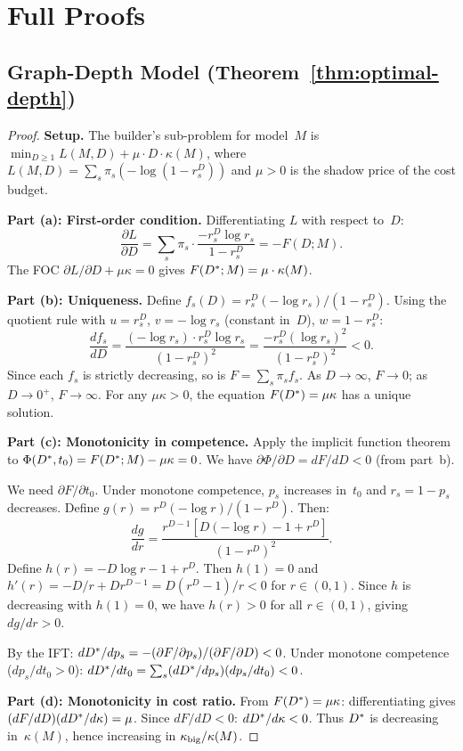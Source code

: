 \appendix
\section{Full Proofs}
\label{app:proofs}

\subsection{Graph-Depth Model (Theorem~\ref{thm:optimal-depth})}
\label{app:graph-depth}

\begin{proof}
\noindent\textbf{Setup.}
The builder's sub-problem for model~$M$ is
$\min_{D \ge 1} L(M,D) + \mu \cdot D \cdot \kappa(M)$,
where $L(M,D) = \sum_s \pi_s (-\log(1 - r_s^D))$ and $\mu > 0$ is the shadow price of the cost budget.

\noindent\textbf{Part (a): First-order condition.}
Differentiating $L$ with respect to~$D$:
\[
  \frac{\partial L}{\partial D}
  = \sum_s \pi_s \cdot \frac{-r_s^D \log r_s}{1 - r_s^D}
  = -F(D; M).
\]
The FOC $\partial L/\partial D + \mu \kappa = 0$ gives $F(D^*; M) = \mu \cdot \kappa(M)$.

\noindent\textbf{Part (b): Uniqueness.}
Define $f_s(D) = r_s^D (-\log r_s) / (1 - r_s^D)$.
Using the quotient rule with $u = r_s^D$, $v = -\log r_s$ (constant in~$D$), $w = 1 - r_s^D$:
\[
  \frac{df_s}{dD} = \frac{(-\log r_s) \cdot r_s^D \log r_s}{(1-r_s^D)^2}
  = \frac{-r_s^D (\log r_s)^2}{(1-r_s^D)^2} < 0.
\]
Since each $f_s$ is strictly decreasing, so is $F = \sum_s \pi_s f_s$.
As $D \to \infty$, $F \to 0$; as $D \to 0^+$, $F \to \infty$.
For any $\mu \kappa > 0$, the equation $F(D^*) = \mu \kappa$ has a unique solution.

\noindent\textbf{Part (c): Monotonicity in competence.}
Apply the implicit function theorem to $\Phi(D^*, t_0) = F(D^*; M) - \mu\kappa = 0$.
We have $\partial \Phi / \partial D = dF/dD < 0$ (from part~b).

We need $\partial F / \partial t_0$.
Under monotone competence, $p_s$ increases in~$t_0$ and $r_s = 1-p_s$ decreases.
Define $g(r) = r^D(-\log r)/(1-r^D)$.
Then:
\[
  \frac{dg}{dr} = \frac{r^{D-1}[D(-\log r) - 1 + r^D]}{(1-r^D)^2}.
\]
Define $h(r) = -D\log r - 1 + r^D$.
Then $h(1) = 0$ and $h'(r) = -D/r + Dr^{D-1} = D(r^D - 1)/r < 0$ for $r \in (0,1)$.
Since $h$ is decreasing with $h(1) = 0$, we have $h(r) > 0$ for all $r \in (0,1)$, giving $dg/dr > 0$.

By the IFT:
$dD^*/dp_s = -(\partial F/\partial p_s) / (\partial F/\partial D) < 0$.
Under monotone competence ($dp_s/dt_0 > 0$):
$dD^*/dt_0 = \sum_s (dD^*/dp_s)(dp_s/dt_0) < 0$.

\noindent\textbf{Part (d): Monotonicity in cost ratio.}
From $F(D^*) = \mu\kappa$: differentiating gives $(dF/dD)(dD^*/d\kappa) = \mu$.
Since $dF/dD < 0$: $dD^*/d\kappa < 0$.
Thus $D^*$ is decreasing in~$\kappa(M)$, hence increasing in $\kappa_{\mathrm{big}}/\kappa(M)$.
\end{proof}


